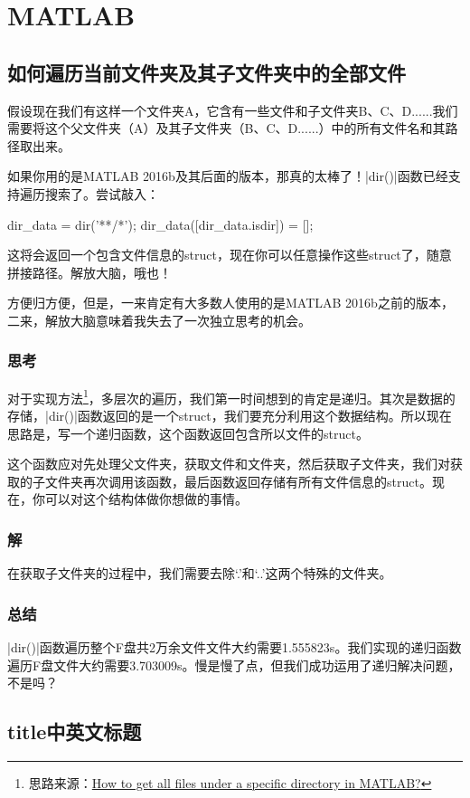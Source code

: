 \chapter{MATLAB}

\section{如何遍历当前文件夹及其子文件夹中的全部文件}

假设现在我们有这样一个文件夹A，它含有一些文件和子文件夹B、C、D......我们需要将这个父文件夹（A）及其子文件夹（B、C、D......）中的所有文件名和其路径取出来。

如果你用的是MATLAB 2016b及其后面的版本，那真的太棒了！\Matlabinline|dir()|函数已经支持遍历搜索了。尝试敲入：

\begin{Matlabcode}
dir_data = dir('**/*');
dir_data([dir_data.isdir]) = [];  %
\end{Matlabcode}

这将会返回一个包含文件信息的struct，现在你可以任意操作这些struct了，随意拼接路径。解放大脑，哦也！

方便归方便，但是，一来肯定有大多数人使用的是MATLAB 2016b之前的版本，二来，解放大脑意味着我失去了一次独立思考的机会。

\subsection*{思考}

对于实现方法\footnote{思路来源：\href{https://stackoverflow.com/questions/2652630/how-to-get-all-files-under-a-specific-directory-in-matlab}{How to get all files under a specific directory in MATLAB?}}，多层次的遍历，我们第一时间想到的肯定是递归。其次是数据的存储，\Matlabinline|dir()|函数返回的是一个struct，我们要充分利用这个数据结构。所以现在思路是，写一个递归函数，这个函数返回包含所以文件的struct。

这个函数应对先处理父文件夹，获取文件和文件夹，然后获取子文件夹，我们对获取的子文件夹再次调用该函数，最后函数返回存储有所有文件信息的struct。现在，你可以对这个结构体做你想做的事情。

\subsection*{解}

在获取子文件夹的过程中，我们需要去除`.'和`..'这两个特殊的文件夹。


\subsection*{总结}
\Matlabinline|dir()|函数遍历整个F盘共2万余文件文件大约需要1.555823s。我们实现的递归函数遍历F盘文件大约需要3.703009s。慢是慢了点，但我们成功运用了递归解决问题，不是吗？

\section{title中英文标题}